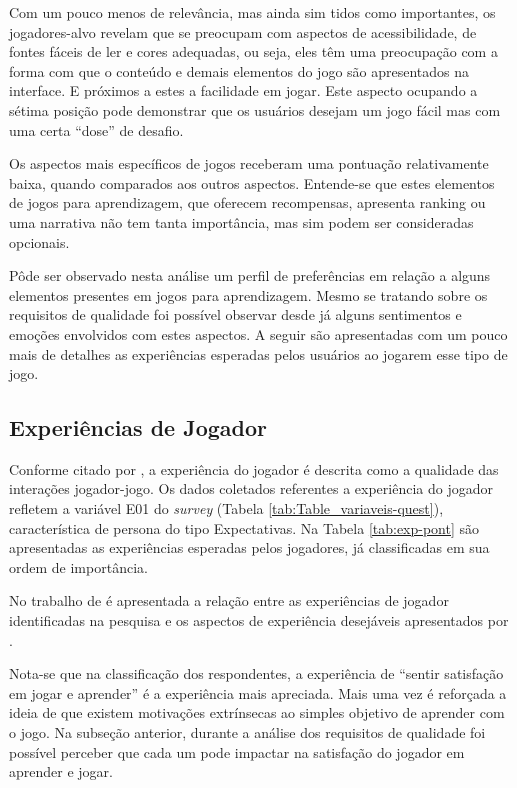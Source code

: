 Com um pouco menos de relevância, mas ainda sim tidos como importantes, os jogadores-alvo revelam que se preocupam com aspectos de acessibilidade, de fontes fáceis de ler e cores adequadas, ou seja, eles têm uma preocupação com a forma com que o conteúdo e demais elementos do jogo são apresentados na interface. E próximos a estes a facilidade em jogar. Este aspecto ocupando a sétima posição pode demonstrar que os usuários desejam um jogo fácil mas com uma certa ``dose'' de desafio.

Os aspectos mais específicos de jogos receberam uma pontuação relativamente baixa, quando comparados aos outros aspectos. Entende-se que estes elementos de jogos para aprendizagem, que oferecem recompensas, apresenta ranking ou uma narrativa não tem tanta importância, mas sim podem ser consideradas opcionais.

Pôde ser observado nesta análise um perfil de preferências em relação a alguns elementos presentes em jogos para aprendizagem. Mesmo se tratando sobre os requisitos de qualidade foi possível observar desde já alguns sentimentos e emoções envolvidos com estes aspectos. A seguir são apresentadas com um pouco mais de detalhes as experiências esperadas pelos usuários ao jogarem esse tipo de jogo.

\subsection{Experiências de Jogador}

Conforme citado por , a experiência do jogador é descrita como a qualidade das interações jogador-jogo. Os dados coletados referentes a experiência do jogador refletem a variável E01 do \textit{survey} (Tabela \ref{tab:Table_variaveis-quest}), característica de persona do tipo Expectativas. Na Tabela \ref{tab:exp-pont} são apresentadas as experiências esperadas pelos jogadores, já classificadas em sua ordem de importância.



No trabalho de  é apresentada a relação entre as experiências de jogador identificadas na pesquisa e os aspectos de experiência desejáveis apresentados por .

Nota-se que na classificação dos respondentes, a experiência de ``sentir satisfação em jogar e aprender'' é a experiência mais apreciada. Mais uma vez é reforçada a ideia de que existem motivações extrínsecas ao simples objetivo de aprender com o jogo. Na subseção anterior, durante a análise dos requisitos de qualidade foi possível perceber que cada um pode impactar na satisfação do jogador em aprender e jogar.  

